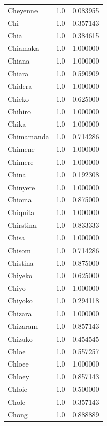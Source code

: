 \documentclass[
  letterpaper,
  DIV=11,
  numbers=noendperiod]{scrreprt}
\begin{document}
\begin{tabular}{lrr}
Cheyenne        &   1.0 &   0.083955 \\
Chi             &   1.0 &   0.357143 \\
Chia            &   1.0 &   0.384615 \\
Chiamaka        &   1.0 &   1.000000 \\
Chiana          &   1.0 &   1.000000 \\
Chiara          &   1.0 &   0.590909 \\
Chidera         &   1.0 &   1.000000 \\
Chieko          &   1.0 &   0.625000 \\
Chihiro         &   1.0 &   1.000000 \\
Chika           &   1.0 &   1.000000 \\
Chimamanda      &   1.0 &   0.714286 \\
Chimene         &   1.0 &   1.000000 \\
Chimere         &   1.0 &   1.000000 \\
China           &   1.0 &   0.192308 \\
Chinyere        &   1.0 &   1.000000 \\
Chioma          &   1.0 &   0.875000 \\
Chiquita        &   1.0 &   1.000000 \\
Chirstina       &   1.0 &   0.833333 \\
Chisa           &   1.0 &   1.000000 \\
Chisom          &   1.0 &   0.714286 \\
Chistina        &   1.0 &   0.875000 \\
Chiyeko         &   1.0 &   0.625000 \\
Chiyo           &   1.0 &   1.000000 \\
Chiyoko         &   1.0 &   0.294118 \\
Chizara         &   1.0 &   1.000000 \\
Chizaram        &   1.0 &   0.857143 \\
Chizuko         &   1.0 &   0.454545 \\
Chloe           &   1.0 &   0.557257 \\
Chloee          &   1.0 &   1.000000 \\
Chloey          &   1.0 &   0.857143 \\
Chloie          &   1.0 &   0.500000 \\
Chole           &   1.0 &   0.357143 \\
Chong           &   1.0 &   0.888889 \\

\end{tabular}
\end{document}
